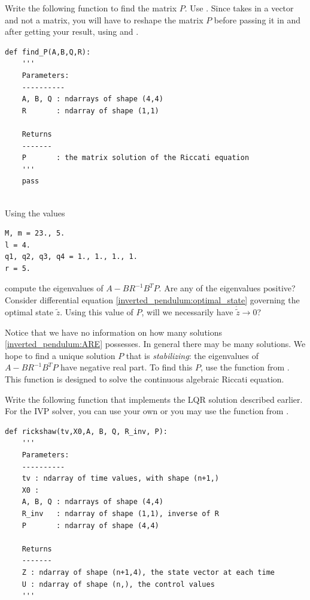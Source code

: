 \begin{problem}
Write the following function to find the matrix $P$. 
Use . 
Since  takes in a vector and not a matrix, you will have to reshape the matrix $P$ before passing it in and after getting your result, using  and .
\begin{lstlisting}
def find_P(A,B,Q,R):
	'''
	Parameters:
	----------
	A, B, Q : ndarrays of shape (4,4)
	R		: ndarray of shape (1,1)
	
	Returns
	-------
	P		: the matrix solution of the Riccati equation
	'''
	pass


\end{lstlisting}
Using the values 
\begin{lstlisting}
M, m = 23., 5.
l = 4.
q1, q2, q3, q4 = 1., 1., 1., 1.
r = 5.
\end{lstlisting}
compute the eigenvalues of $A - BR^{-1}B^TP$.
Are any of the eigenvalues positive? 
Consider differential equation \eqref{inverted_pendulum:optimal_state} governing the optimal state $\tilde{z}$. 
Using this value of $P$, will we necessarily have $\dot{\tilde{z}} \to 0$?
\end{problem}


Notice that we have no information on how many solutions \eqref{inverted_pendulum:ARE} possesses. 
In general there may be many solutions. 
We hope to find a unique solution $P$ that is \textit{stabilizing}: the eigenvalues of $A - BR^{-1}B^TP$ have negative real part. 
To find this $P$, use the function  from . 
This function is designed to solve the continuous algebraic Riccati equation. 

\begin{problem}
	Write the following function that implements the LQR solution described earlier.  For the IVP solver, you can use your own or you may use the function  from .
\begin{lstlisting}
def rickshaw(tv,X0,A, B, Q, R_inv, P):
	'''
	Parameters:
	----------
	tv : ndarray of time values, with shape (n+1,)
	X0 : 
	A, B, Q	: ndarrays of shape (4,4)
	R_inv	: ndarray of shape (1,1), inverse of R
	P		: ndarray of shape (4,4)
	
	Returns
	-------
	Z : ndarray of shape (n+1,4), the state vector at each time
	U : ndarray of shape (n,), the control values
	'''
\end{lstlisting}
\label{prob:inverted_pendulum3}
\end{problem}

